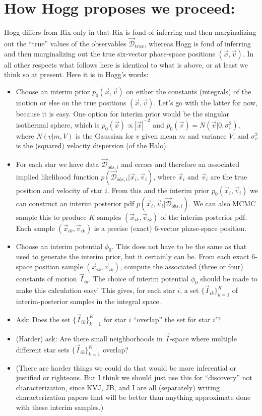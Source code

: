 \documentclass[12pt,a4paper,twoside]{article}
\newcommand{\vx}{\vec{x}}
\newcommand{\vv}{\vec{v}}
\newcommand{\vI}{\vec{I}}
\newcommand{\dtrue}{\vec{\mathcal D}_{\mathrm true}}
\newcommand{\vxi}{\vec{x}_i}
\newcommand{\vvi}{\vec{v}_i}
\newcommand{\vxik}{\vec{x}_{ik}}
\newcommand{\vvik}{\vec{v}_{ik}}
\newcommand{\vIik}{\vec{I}_{ik}}
\newcommand{\vIikset}{\{\vIik\}_{k=1}^K}
\newcommand{\dobsi}{\vec{\mathcal D}_{{\mathrm obs},i}}
\begin{document}
\section{How Hogg proposes we proceed:}

Hogg differs from Rix only in that Rix is fond of inferring and then
marginalizing out the ``true'' values of the observables $\dtrue$,
whereas Hogg is fond of inferring and then marginalizing out the true
six-vector phase-space positions $(\vx,\vv)$.  In all other respects
what follows here is identical to what is above, or at least we think
so at present.  Here it is in Hogg's words:

\begin{itemize}
\item Choose an interim prior $p_0(\vx, \vv)$ on either the constants
  (integrals) of the motion or else on the true positions $(\vx,
  \vv)$.
  Let's go with the latter for now, because it is easy.
  One option for interim prior would be the singular isothermal sphere,
  which is $p_0(\vx)\propto |\vx|^{-2}$ and $p_0(\vv)=N(\vv|0,\sigma_v^2)$,
  where $N(v|m,V)$ is the Gaussian for $v$ given mean $m$ and variance $V$,
  and $\sigma_v^2$ is the (squared) velocity dispersion (of the Halo).

\item For each star we have data $\dobsi$ and errors
  and therefore an associated implied likelihood function $p(\dobsi|\vxi,\vvi)$,
  where $\vxi$ and $\vvi$ are the true position and velocity of star $i$.
  From this and the interim prior $p_0(\vxi,\vvi)$ we can construct an
  interim posterior pdf $p(\vxi,\vvi|\dobsi)$.
  We can also MCMC sample this to produce $K$ samples $(\vxik,\vvik)$
  of the interim posterior pdf.
  Each sample $(\vxik,\vvik)$ is a precise (exact) 6-vector phase-space position.

\item Choose an interim potential $\phi_0$.
  This does not have to be the same as that used to generate the interim prior, but it certainly can be.
  From each exact 6-space position sample $(\vxik,\vvik)$,
  compute the associated (three or four) constants of motion $\vIik$.
  The choice of interim potential $\phi_0$ should be made to make this calculation easy!
  This gives, for each star $i$, a set $\vIikset$ of interim-posterior samples in the integral space.

\item Ask:
  Does the set $\vIikset$ for star $i$ ``overlap'' the set for star $i'$?

\item (Harder) ask:
  Are there small neighborhoods in $\vI$-space
  where multiple different star sets $\vIikset$ overlap?

\item (There are harder things we could do that would be more
  inferential or justified or righteous.  But I think we should just
  use this for ``discovery'' not characterization, since KVJ, JB, and
  I are all (separately) writing characterization papers that will be
  better than anything approximate done with these interim samples.)
\end{itemize}
\end{document}
